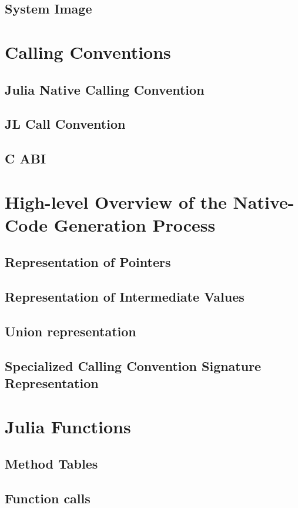     \subsection{System Image}
    \section{Calling Conventions}
    \subsection{Julia Native Calling Convention}
    \subsection{JL Call Convention}
    \subsection{C ABI}
    \section{High-level Overview of the Native-Code Generation Process}
    \subsection{Representation of Pointers}
    \subsection{Representation of Intermediate Values}
    \subsection{Union representation}
    \subsection{Specialized Calling Convention Signature Representation}
    \section{Julia Functions}
    \subsection{Method Tables}
    \subsection{Function calls}
